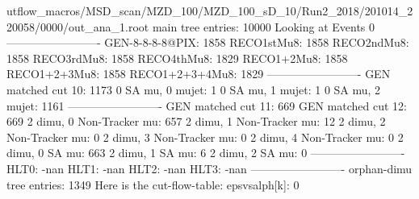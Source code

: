 utflow_macros/MSD_scan/MZD_100/MZD_100_sD_10/Run2_2018/201014_220058/0000/out_ana_1.root
main tree entries: 10000
Looking at Events 0
-------------------------
GEN-8-8-8-8@PIX: 1858
RECO1stMu8: 1858
RECO2ndMu8: 1858
RECO3rdMu8: 1858
RECO4thMu8: 1829
RECO1+2Mu8: 1858
RECO1+2+3Mu8: 1858
RECO1+2+3+4Mu8: 1829
-------------------------
GEN matched cut 10: 1173
0 SA mu, 0 mujet: 1
0 SA mu, 1 mujet: 1
0 SA mu, 2 mujet: 1161
-------------------------
GEN matched cut 11: 669
GEN matched cut 12: 669
2 dimu, 0 Non-Tracker mu: 657
2 dimu, 1 Non-Tracker mu: 12
2 dimu, 2 Non-Tracker mu: 0
2 dimu, 3 Non-Tracker mu: 0
2 dimu, 4 Non-Tracker mu: 0
2 dimu, 0 SA mu: 663
2 dimu, 1 SA mu: 6
2 dimu, 2 SA mu: 0
-------------------------
HLT0: -nan
HLT1: -nan
HLT2: -nan
HLT3: -nan
-------------------------
orphan-dimu tree entries: 1349
Here is the cut-flow-table:
epsvsalph[k]: 0
        
